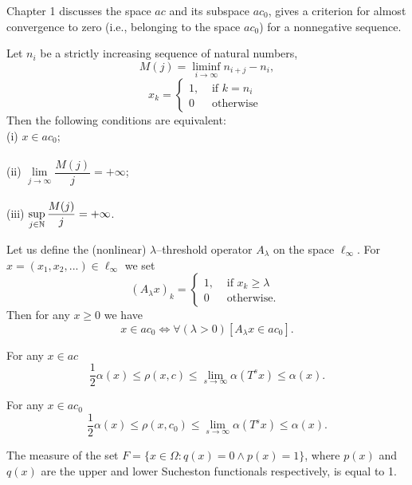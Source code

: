 Chapter 1 discusses the space $ac$ and its subspace $ac_0$, gives a criterion for almost convergence to zero
(i.e., belonging to the space $ac_0$) for a nonnegative sequence.

	Let $n_i$ be a strictly increasing sequence of natural numbers,
	\begin{equation}
		\label{eq:definition_M_j}
		M(j) = \liminf_{i\to\infty} n_{i+j} - n_i,
	\end{equation}
	\begin{equation}
		x_k = \left\{\begin{array}{ll}
			1, & \mbox{~if~} k = n_i
			\\
			0  & \mbox{~otherwise~}
		\end{array}\right.
	\end{equation}
	Then the following conditions are equivalent:
	\\
	(i)   $x \in ac_0$;
	\\\\
	(ii)  $\lim\limits_{j \to \infty} \dfrac{M(j)}{j} = +\infty$;
	\\\\
	(iii) $\sup\limits_{j \in \mathbb{N}}     \dfrac{M(j)}{j} = +\infty$.


	Let us define the (nonlinear) $\lambda$--threshold operator $A_\lambda$ on the space $\ell_\infty$.
	For $x = (x_1, x_2, ...) \in \ell_\infty$ we set
	\begin{equation}
		(A_\lambda x)_k = \begin{cases}
			1, & \mbox{~if~} x_k \geq \lambda
			\\
			0  & \mbox{~otherwise.~}
		\end{cases}
	\end{equation}
	Then for any $x\geq 0$ we have
	\begin{equation}
		x\in ac_0 \Leftrightarrow
		\forall(\lambda>0)[A_\lambda x \in ac_0]
		.
	\end{equation}

	For any $x\in ac$
	\begin{equation}
		\frac{1}{2} \alpha(x) \leq \rho(x,c)\leq \lim_{s\to\infty} \alpha(T^s x)
		\leq \alpha(x)
		.
	\end{equation}

	For any $x\in ac_0$
	\begin{equation}
		\frac{1}{2} \alpha(x) \leq \rho(x,c_0)\leq \lim_{s\to\infty} \alpha(T^s x)
		\leq \alpha(x)
		.
	\end{equation}

	The measure of the set $F=\{x\in\Omega : q(x) = 0 \wedge p(x)= 1\}$,
	where $p(x)$ and $q(x)$ are the upper and lower Sucheston functionals respectively,
	is equal to 1.
